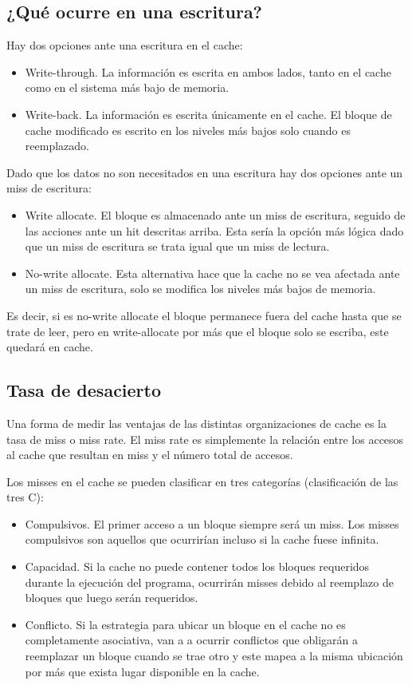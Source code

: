 \subsection{¿Qué ocurre en una escritura?}

Hay dos opciones ante una escritura en el cache:

\begin{itemize}
\item Write-through. La información es escrita en ambos lados, tanto en el cache como en el sistema más bajo de memoria.
\item Write-back. La información es escrita únicamente en el cache. El bloque de cache modificado es escrito en los niveles más bajos solo cuando es reemplazado.
\end{itemize}

Dado que los datos no son necesitados en una escritura hay dos opciones ante un miss de escritura:


\begin{itemize}
\item Write allocate. El bloque es almacenado ante un miss de escritura, seguido de las acciones ante un hit descritas arriba. Esta sería la opción más lógica dado que un miss de escritura se trata igual que un miss de lectura.
\item No-write allocate. Esta alternativa hace que la cache no se vea afectada ante un miss de escritura, solo se modifica los niveles más bajos de memoria.
\end{itemize}

Es decir, si es no-write allocate el bloque permanece fuera del cache hasta que se trate de leer, pero en write-allocate por más que el bloque solo se escriba, este quedará en cache.

\subsection{Tasa de desacierto}
Una forma de medir las ventajas de las distintas organizaciones de cache es la tasa de miss o miss rate. El miss rate es simplemente la relación entre los accesos al cache que resultan en miss y el número total de accesos.

Los misses en el cache se pueden clasificar en tres categorías (clasificación de las tres C):


\begin{itemize}
\item Compulsivos. El primer acceso a un bloque siempre será un miss. Los misses compulsivos son aquellos que ocurrirían incluso si la cache fuese infinita. 
\item Capacidad. Si la cache no puede contener todos los bloques requeridos durante la ejecución del programa, ocurrirán misses debido al reemplazo de bloques que luego serán requeridos. 
\item Conflicto. Si la estrategia para ubicar un bloque en el cache no es completamente asociativa, van a a ocurrir conflictos que obligarán a reemplazar un bloque cuando se trae otro y este mapea a la misma ubicación por más que exista lugar disponible en la cache.
\end{itemize}


